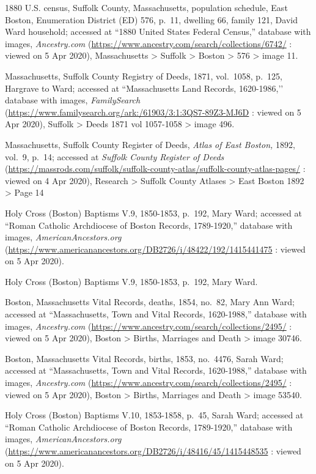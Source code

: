\begin{thebibliography}{999}
1880 U.S. census, Suffolk County, Massachusetts, population schedule, East Boston, Enumeration District (ED) 576, p.\ 11, dwelling 66, family 121, David Ward household; accessed at ``1880 United States Federal Census,'' database with images, \textit{Ancestry.com} (\url{https://www.ancestry.com/search/collections/6742/} : viewed on 5 Apr 2020), Massachusetts > Suffolk > Boston > 576 > image 11.

Massachusetts, Suffolk County Registry of Deeds, 1871, vol.\ 1058, p.\ 125, Hargrave to Ward; accessed at ``Massachusetts Land Records, 1620-1986,’’ database with images, \textit{FamilySearch} (\url{https://www.familysearch.org/ark:/61903/3:1:3QS7-89Z3-MJ6D} : viewed on 5 Apr 2020), Suffolk > Deeds 1871 vol 1057-1058 > image 496.

Massachusetts, Suffolk County Register of Deeds, \textit{Atlas of East Boston,} 1892, vol.\ 9, p.\ 14; accessed at \textit{Suffolk County Register of Deeds} (\url{https://massrods.com/suffolk/suffolk-county-atlas/suffolk-county-atlas-pages/} : viewed on 4 Apr 2020), Research > Suffolk County Atlases > East Boston 1892 > Page 14

Holy Cross (Boston) Baptisms V.9, 1850-1853, p.\ 192, Mary Ward; accessed at ``Roman Catholic Archdiocese of Boston Records, 1789-1920,'' database with images, \textit{AmericanAncestors.org} (\url{https://www.americanancestors.org/DB2726/i/48422/192/1415441475} : viewed on 5 Apr 2020).	

Holy Cross (Boston) Baptisms V.9, 1850-1853, p.\ 192, Mary Ward.

Boston, Massachusetts Vital Records, deaths, 1854, no.\ 82, Mary Ann Ward; accessed at ``Massachusetts, Town and Vital Records, 1620-1988,'' database with images, \textit{Ancestry.com} (\url{https://www.ancestry.com/search/collections/2495/} : viewed on 5 Apr 2020), Boston > Births, Marriages and Death > image 30746.

Boston, Massachusetts Vital Records, births, 1853, no.\ 4476, Sarah Ward; accessed at ``Massachusetts, Town and Vital Records, 1620-1988,'' database with images, \textit{Ancestry.com} (\url{https://www.ancestry.com/search/collections/2495/} : viewed on 5 Apr 2020), Boston > Births, Marriages and Death > image 53540.

Holy Cross (Boston) Baptisms V.10, 1853-1858, p.\ 45, Sarah Ward; accessed at ``Roman Catholic Archdiocese of Boston Records, 1789-1920,'' database with images, \textit{AmericanAncestors.org} (\url{https://www.americanancestors.org/DB2726/i/48416/45/1415448535} : viewed on 5 Apr 2020).	


\end{thebibliography}
